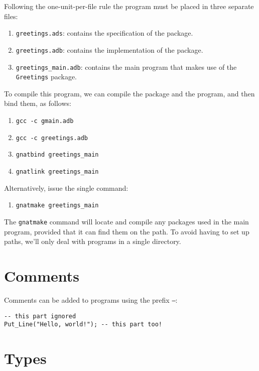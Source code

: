 Following the one-unit-per-file rule the program must be placed in
three separate files:

\begin{enumerate}

\item \texttt{greetings.ads}: contains the specification of the package.

\item \texttt{greetings.adb}:  contains the implementation of the package.

\item \texttt{greetings\_main.adb}: contains the main program that makes use of the \texttt{Greetings} package.

\end{enumerate}

To compile this program, we can compile the package and the program, and then bind them, as follows:

\begin{enumerate}
 \item \texttt{gcc -c gmain.adb}
 \item \texttt{gcc -c greetings.adb}
 \item \texttt{gnatbind greetings\_main}
 \item \texttt{gnatlink greetings\_main}
\end{enumerate}

Alternatively, issue the single command:

 \begin{enumerate}
 \item \texttt{gnatmake greetings\_main}
\end{enumerate}

The \texttt{gnatmake} command will locate and compile any packages used in the main program, provided that it can find them on the path. To avoid having to set up paths, we'll only deal with programs in a single directory.

\section{Comments}

Comments can be added to programs using the prefix \texttt{--}:

\begin{lstlisting}[caption={Comments}]
-- this part ignored
Put_Line("Hello, world!"); -- this part too!
\end{lstlisting}


\section{Types}

